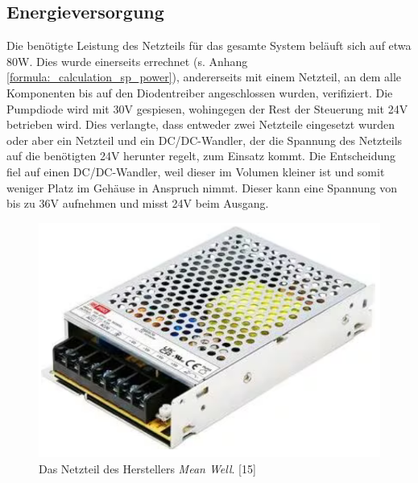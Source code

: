 \subsection{Energieversorgung}
Die benötigte Leistung des Netzteils für das gesamte System beläuft sich auf etwa 80W. Dies wurde einerseits errechnet (s. Anhang \ref{formula:_calculation_sp_power}), andererseits mit einem Netzteil, an dem alle Komponenten bis auf den Diodentreiber angeschlossen wurden, verifiziert. Die Pumpdiode wird mit 30V gespiesen, wohingegen der Rest der Steuerung mit 24V betrieben wird. Dies verlangte, dass entweder zwei Netzteile eingesetzt wurden oder aber ein Netzteil und ein DC/DC-Wandler, der die Spannung des Netzteils auf die benötigten 24V herunter regelt, zum Einsatz kommt. Die Entscheidung fiel auf einen DC/DC-Wandler, weil dieser im Volumen kleiner ist und somit weniger Platz im Gehäuse in Anspruch nimmt. Dieser kann eine Spannung von bis zu 36V aufnehmen und misst 24V beim Ausgang.

\begin{figure}[H]
    \centering
    \includegraphics[scale=0.7]{98_images/controller_ps.PNG}
    \caption{Das Netzteil des Herstellers \textit{Mean Well}. [15]}
    \label{fig:controller_ps_hw}
\end{figure}

